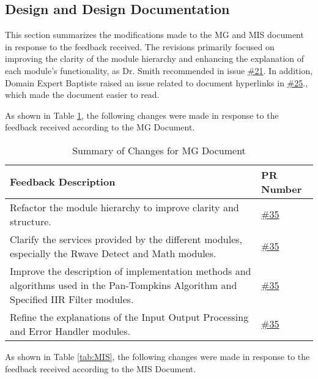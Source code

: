 \documentclass{article}
\begin{document}
\subsection{Design and Design Documentation}

This section summarizes the modifications made to the MG and MIS document in
response to the feedback received. The revisions primarily focused on improving
the clarity of the module hierarchy and enhancing the explanation of each
module's functionality, as Dr. Smith recommended in issue
\href{https://github.com/Lychee-acaca/CAS741/issues/21}{\#21}. In addition,
Domain Expert Baptiste raised an issue related to document hyperlinks in
\href{https://github.com/Lychee-acaca/CAS741/issues/25}{\#25}., which made the
document easier to read.

As shown in Table \ref{tab:MG}, the following changes were made in response to
the feedback received according to the MG Document.

\begin{table}[ht] \centering \begin{tabular}{|p{8cm}|p{2.5cm}|} \hline
\textbf{Feedback Description} & \textbf{PR Number} \\
\hline Refactor the module hierarchy to improve clarity and structure. &
\href{https://github.com/Lychee-acaca/CAS741/pull/35}{\#35} \\
\hline Clarify the services provided by the different modules, especially the
Rwave Detect and Math modules. &
\href{https://github.com/Lychee-acaca/CAS741/pull/35}{\#35} \\
\hline
Improve the description of implementation methods and algorithms used in the
Pan-Tompkins Algorithm and Specified IIR Filter modules. &
\href{https://github.com/Lychee-acaca/CAS741/pull/35}{\#35} \\
\hline Refine the explanations of the Input Output Processing and Error Handler
modules. & \href{https://github.com/Lychee-acaca/CAS741/pull/35}{\#35} \\
\hline
\end{tabular} \caption{Summary of Changes for MG Document} \label{tab:MG}
\end{table}

As shown in Table \ref{tab:MIS}, the following changes were made in response to
the feedback received according to the MIS Document.
\end{document}
